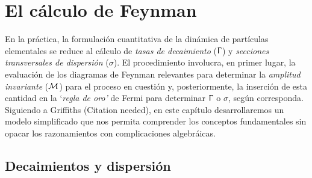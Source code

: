 \chapter{El cálculo de Feynman}
\label{ch:feynmanCalc}

En la práctica, la formulación cuantitativa de la dinámica de partículas elementales se reduce al cálculo de \emph{tasas de decaimiento} ($\Upgamma$) y \emph{secciones transversales de dispersión} ($\sigma$). El procedimiento involucra, en primer lugar, la evaluación de los diagramas de Feynman relevantes para determinar la \emph{amplitud invariante} ($\mathcal{M}$) para el proceso en cuestión y, posteriormente, la inserción de esta cantidad en la `\emph{regla de oro'} de Fermi para determinar $\Upgamma$ o $\sigma$, según corresponda. Siguiendo a Griffiths (Citation needed), en este capítulo desarrollaremos un modelo simplificado que nos permita comprender los conceptos fundamentales sin opacar los razonamientos con complicaciones algebráicas.

\section{Decaimientos y dispersión}

